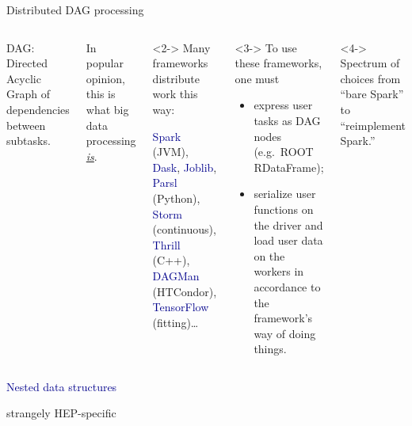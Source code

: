 \documentclass[aspectratio=169]{beamer}
\begin{document}
\begin{frame}{Distributed DAG processing}
\begin{columns}
DAG: Directed Acyclic Graph of dependencies between subtasks.

In popular opinion, this is what big data processing \underline{\it is}.

\vspace{0.5 cm}
\begin{uncoverenv}<2->
Many frameworks distribute work this way:

\vspace{0.2 cm}
\hfill \begin{minipage}{0.95\linewidth}
\textcolor{darkblue}{Spark} (JVM), \textcolor{darkblue}{Dask}, \textcolor{darkblue}{Joblib}, \textcolor{darkblue}{Parsl} (Python), \textcolor{darkblue}{Storm} (continuous), \textcolor{darkblue}{Thrill} (C++), \textcolor{darkblue}{DAGMan} (HTCondor), \textcolor{darkblue}{TensorFlow} (fitting)\ldots
\end{minipage}
\end{uncoverenv}

\vspace{0.5 cm}
\begin{uncoverenv}<3->
To use these frameworks, one must
\begin{itemize}
\item express user tasks as DAG nodes (e.g.\ ROOT RDataFrame);
\item serialize user functions on the driver and load user data on the workers in accordance to the framework's way of doing things.
\end{itemize}
\end{uncoverenv}

\vspace{0.5 cm}
\begin{uncoverenv}<4->
Spectrum of choices from ``bare Spark'' to ``reimplement Spark.''
\end{uncoverenv}
\end{columns}
\end{frame}

\begin{frame}{}
\huge
\vspace{0.5 cm}
\begin{center}
\textcolor{darkblue}{Nested data structures}

\large
\vspace{0.5 cm}
strangely HEP-specific
\end{center}
\end{frame}
\end{document}
